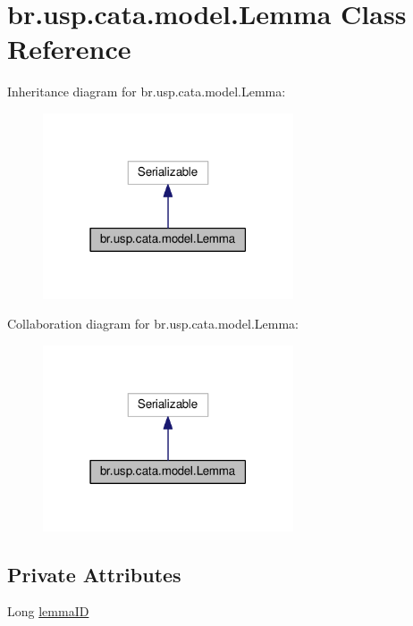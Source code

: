 \hypertarget{classbr_1_1usp_1_1cata_1_1model_1_1_lemma}{\section{br.\+usp.\+cata.\+model.\+Lemma Class Reference}
\label{classbr_1_1usp_1_1cata_1_1model_1_1_lemma}
}


Inheritance diagram for br.\+usp.\+cata.\+model.\+Lemma\+:\nopagebreak
\begin{figure}[H]
\begin{center}
\leavevmode
\includegraphics[width=210pt]{classbr_1_1usp_1_1cata_1_1model_1_1_lemma__inherit__graph}
\end{center}
\end{figure}


Collaboration diagram for br.\+usp.\+cata.\+model.\+Lemma\+:\nopagebreak
\begin{figure}[H]
\begin{center}
\leavevmode
\includegraphics[width=210pt]{classbr_1_1usp_1_1cata_1_1model_1_1_lemma__coll__graph}
\end{center}
\end{figure}
\subsection*{Private Attributes}
\begin{DoxyCompactItemize}
\item 
Long \hyperlink{classbr_1_1usp_1_1cata_1_1model_1_1_lemma_ae78ce11fd795b4348b07f66c823ee813}{lemma\+I\+D}
\end{DoxyCompactItemize}
